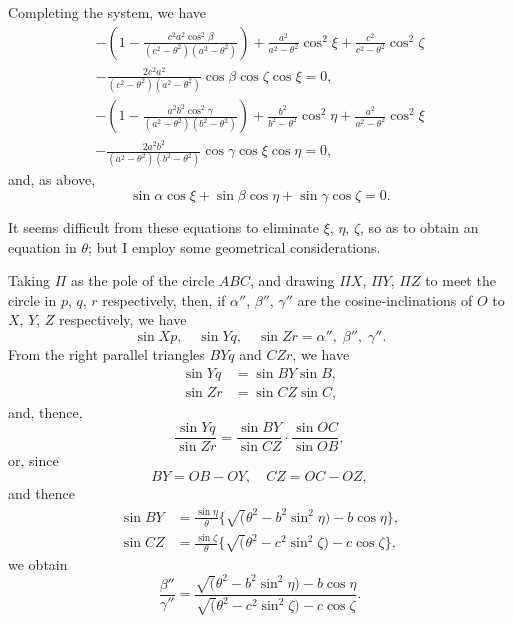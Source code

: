 \documentclass[11pt,a4paper]{book}
\begin{document}
Completing the system, we have
\begin{multline}
-\left(1 - \frac{c^2a^2\cos^2\beta}{(c^2-\theta^2)(a^2-\theta^2)}\right) + \frac{a^2}{a^2-\theta^2}\cos^2\xi + \frac{c^2}{c^2-\theta^2}\cos^2\zeta\\
- \frac{2c^2a^2}{(c^2-\theta^2)(a^2-\theta^2)}\cos\beta\cos\zeta\cos\xi = 0,
\end{multline}
\begin{multline}
-\left(1 - \frac{a^2b^2\cos^2\gamma}{(a^2-\theta^2)(b^2-\theta^2)}\right) + \frac{b^2}{b^2-\theta^2}\cos^2\eta + \frac{a^2}{a^2-\theta^2}\cos^2\xi\\
- \frac{2a^2b^2}{(a^2-\theta^2)(b^2-\theta^2)}\cos\gamma\cos\xi\cos\eta = 0,
\end{multline}
and, as above,
\[
\sin\alpha\cos\xi + \sin\beta\cos\eta + \sin\gamma\cos\zeta = 0.
\]

It seems difficult from these equations to eliminate $\xi$, $\eta$, $\zeta$, so as to obtain an equation in $\theta$; but I employ some geometrical considerations.

Taking $\Pi$ as the pole of the circle $ABC$, and drawing $\Pi X$, $\Pi Y$, $\Pi Z$ to meet the circle in $p$, $q$, $r$ respectively, then, if $\alpha''$, $\beta''$, $\gamma''$ are the cosine-inclinations of $O$ to $X$, $Y$, $Z$ respectively, we have
\[
\sin Xp,\quad \sin Yq,\quad \sin Zr = \alpha'',\; \beta'',\; \gamma''.
\]
From the right parallel triangles $BYq$ and $CZr$, we have
\begin{align*}
\sin Yq &= \sin BY \sin B,\\
\sin Zr &= \sin CZ \sin C,
\end{align*}
and, thence,
\[
\frac{\sin Yq}{\sin Zr} = \frac{\sin BY}{\sin CZ} \cdot \frac{\sin OC}{\sin OB},
\]
or, since
\[
BY = OB - OY,\quad CZ = OC - OZ,
\]
and thence
\begin{align*}
\sin BY &= \frac{\sin\eta}{\theta}\{\surd(\theta^2 - b^2\sin^2\eta) - b\cos\eta\},\\
\sin CZ &= \frac{\sin\zeta}{\theta}\{\surd(\theta^2 - c^2\sin^2\zeta) - c\cos\zeta\},
\end{align*}
we obtain
\[
\frac{\beta''}{\gamma''} = \frac{\surd(\theta^2 - b^2\sin^2\eta) - b\cos\eta}{\surd(\theta^2 - c^2\sin^2\zeta) - c\cos\zeta}.
\]
\end{document}
